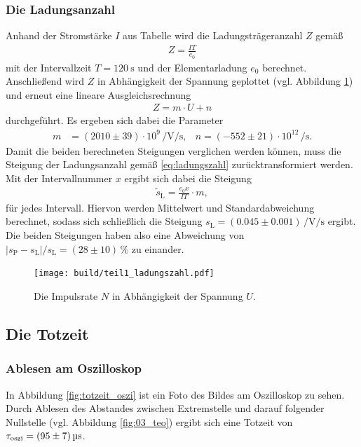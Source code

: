 \subsubsection[]{Die Ladungsanzahl}
Anhand der Stromstärke $I$ aus Tabelle  wird die Ladungsträgeranzahl $Z$ gemäß
\begin{align}
    Z = \frac{I T}{e_0}
\end{align}
mit der Intervallzeit $T = \qty[]{120}{\second}$ und der Elementarladung $e_0$ berechnet.
Anschließend wird $Z$ in Abhängigkeit der Spannung geplottet (vgl. Abbildung \ref{fig:ladungszahl}) und erneut eine lineare Ausgleichsrechnung
\begin{align}
    Z = m \cdot U + n
    \label{eq:ladungszahl}
\end{align}
durchgeführt.
Es ergeben sich dabei die Parameter
\begin{align}
    m &= (2010 \pm 39) \cdot 10^9 \, \unit{\per\volt\per\second},  & n = (-552 \pm 21) \cdot 10^{12} \, \unit{\per\second}.
\end{align}
Damit die beiden berechneten Steigungen verglichen werden können, muss die Steigung der Ladungsanzahl gemäß \eqref{eq:ladungszahl}
zurücktransformiert werden.
Mit der Intervallnummer $x$ ergibt sich dabei die Steigung
\begin{align}
    \tilde{s}_\text{L} = \frac{e_0 x}{I T} \cdot m,
\end{align}
für jedes Intervall.
Hiervon werden Mittelwert und Standardabweichung berechnet, sodass sich schließlich die Steigung 
$s_\text{L} = (0.045 \pm 0.001) \, \unit{\per\volt\per\second}$ ergibt.
Die beiden Steigungen haben also eine Abweichung von $|s_\text{P} - s_\text{L}|/s_\text{L} = (28 \pm 10) \, \%$ zu einander.

\begin{figure}[H]
    \centering
    \texttt{[image: build/teil1\_ladungszahl.pdf]}
    \caption{Die Impulsrate $N$ in Abhängigkeit der Spannung $U$.}
    \label{fig:ladungszahl}
\end{figure}






\subsection[]{Die Totzeit}

\subsubsection[]{Ablesen am Oszilloskop}
In Abbildung \ref{fig:totzeit_oszi} ist ein Foto des Bildes am Oszilloskop zu sehen.
Durch Ablesen des Abstandes zwischen Extremstelle und darauf folgender Nullstelle (vgl. Abbildung \ref{fig:03_teo}) ergibt 
sich eine Totzeit von $\tau_\text{oszi} = \qty[]{95 +- 7}{\micro\second}$.

